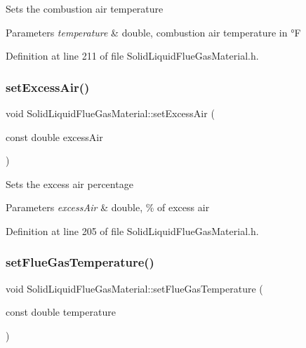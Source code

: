 Sets the combustion air temperature 
\begin{DoxyParams}{Parameters}
{\em temperature} & double, combustion air temperature in °F \\
\hline
\end{DoxyParams}


Definition at line 211 of file Solid\+Liquid\+Flue\+Gas\+Material.\+h.

\mbox{\label{class_solid_liquid_flue_gas_material_a7a3f9f77d267afc05f5fde1da9329ec5}} 
\subsubsection{\texorpdfstring{set\+Excess\+Air()}{setExcessAir()}}
{\footnotesize\ttfamily void Solid\+Liquid\+Flue\+Gas\+Material\+::set\+Excess\+Air (\begin{DoxyParamCaption}\item[{const double}]{excess\+Air }\end{DoxyParamCaption})\hspace{0.3cm}{\ttfamily [inline]}}

Sets the excess air percentage 
\begin{DoxyParams}{Parameters}
{\em excess\+Air} & double, \% of excess air \\
\hline
\end{DoxyParams}


Definition at line 205 of file Solid\+Liquid\+Flue\+Gas\+Material.\+h.

\mbox{\label{class_solid_liquid_flue_gas_material_ae647700dbff5ccea7938b2117f2c3156}} 
\subsubsection{\texorpdfstring{set\+Flue\+Gas\+Temperature()}{setFlueGasTemperature()}}
{\footnotesize\ttfamily void Solid\+Liquid\+Flue\+Gas\+Material\+::set\+Flue\+Gas\+Temperature (\begin{DoxyParamCaption}\item[{const double}]{temperature }\end{DoxyParamCaption})\hspace{0.3cm}{\ttfamily [inline]}}

